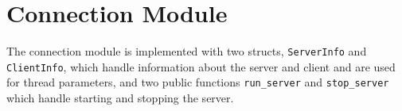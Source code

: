 \section{Connection Module}
The connection module is implemented with two structs, \lstinline|ServerInfo| and \lstinline|ClientInfo|, which handle information about the server and client and are used for thread parameters, and two public functions \lstinline|run_server| and \lstinline|stop_server| which handle starting and stopping the server.

